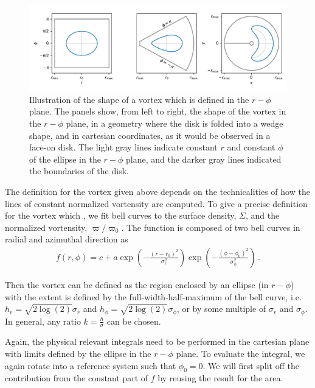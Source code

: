 \documentclass[a4paper]{scrartcl}
\begin{document}
\begin{figure}
  \begin{center}
    \includegraphics[width=\textwidth]{geometries.pdf}
    \caption{\label{fig:geometries}Illustration of the shape of a vortex which is defined in the $r-\phi$ plane.
    The panels show, from left to right, the shape of the vortex in the $r-\phi$ plane, 
    in a geometry where the disk is folded into a wedge shape, 
    and in cartesian coordinates, as it would be observed in a face-on disk.
    The light gray lines indicate constant $r$ and constant $\phi$ of the ellipse in the $r-\phi$ plane,
    and the darker gray lines indicated the boundaries of the disk.}
  \end{center}
\end{figure}

The definition for the vortex given above depends on the technicalities of how 
the lines of constant normalized vortensity are computed.
To give a precise definition for the vortex which , we fit bell curves to the surface density, $\Sigma$,
and the normalized vortensity, $\varpi/\varpi_0$.
The function is composed of two bell curves in radial and azimuthal direction as
\begin{align}
  f(r, \phi) = c + a \exp\left( - \frac{(r - r_0)^2}{\sigma_r^2} \right) \exp\left( - \frac{(\phi - \phi_0)^2}{\sigma_\phi^2} \right)\,.
\end{align}

Then the vortex can be defined as the region enclosed by an ellipse (in $r-\phi$)
with the extent is defined by the full-width-half-maximum of the bell curve, i.e. $h_r = \sqrt{2 \log(2)} \sigma_r$
and $h_\phi = \sqrt{2 \log(2)} \sigma_\phi$, or by some multiple of $\sigma_r$ and $\sigma_\phi$.
In general, any ratio $k = \frac{h}{\sigma}$ can be chosen.

Again, the physical relevant integrals need to be performed in the cartesian plane with limits defined by
the ellipse in the $r-\phi$ plane.
To evaluate the integral, we again rotate into a reference system such that $\phi_0 = 0$.
We will first split off the contribution from the constant part of $f$ by reusing the result for the area.
\end{document}
